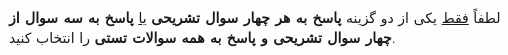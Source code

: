 \documentclass[a4paper]{article}
\makeatletter
\def\theenumii{\@abjad \c@enumii}
\let\endgraph\par
\makeatother
\begin{document}
	\vspace*{0mm}

\medskip

		\def\labelenumi{\textbf{\theenumi}.}
		\def\labelenumii{({\theenumii})}
\vspace*{-1.6cm}
\hspace*{-.8cm}
لطفاً \underline{فقط} یکی از دو گزینه \textbf{پاسخ به هر چهار سوال تشریحی }
\hspace*{.2cm}
\underline{یا} \hspace*{.2cm}
\textbf{پاسخ به سه سوال از چهار سوال تشریحی و پاسخ به همه سوالات تستی} را انتخاب کنید.
\end{document}
